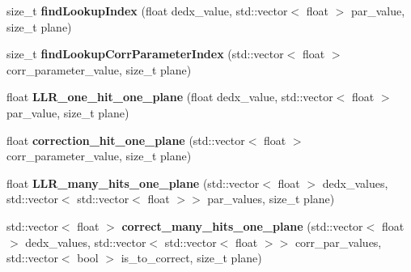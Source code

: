 \begin{DoxyCompactItemize}
\item 
size\+\_\+t {\bfseries find\+Lookup\+Index} (float dedx\+\_\+value, std\+::vector$<$ float $>$ par\+\_\+value, size\+\_\+t plane)\hypertarget{classsearchingfornues_1_1LLRPID_a891182e0af5e60e975e86ea5d2973e11}{}\label{classsearchingfornues_1_1LLRPID_a891182e0af5e60e975e86ea5d2973e11}

\item 
size\+\_\+t {\bfseries find\+Lookup\+Corr\+Parameter\+Index} (std\+::vector$<$ float $>$ corr\+\_\+parameter\+\_\+value, size\+\_\+t plane)\hypertarget{classsearchingfornues_1_1LLRPID_a855edcd3348bff52449abd4b90b42838}{}\label{classsearchingfornues_1_1LLRPID_a855edcd3348bff52449abd4b90b42838}

\item 
float {\bfseries L\+L\+R\+\_\+one\+\_\+hit\+\_\+one\+\_\+plane} (float dedx\+\_\+value, std\+::vector$<$ float $>$ par\+\_\+value, size\+\_\+t plane)\hypertarget{classsearchingfornues_1_1LLRPID_a615612fe3657b51e18bf1e514399363a}{}\label{classsearchingfornues_1_1LLRPID_a615612fe3657b51e18bf1e514399363a}

\item 
float {\bfseries correction\+\_\+hit\+\_\+one\+\_\+plane} (std\+::vector$<$ float $>$ corr\+\_\+parameter\+\_\+value, size\+\_\+t plane)\hypertarget{classsearchingfornues_1_1LLRPID_a06901bea0c1a2e5b9e3d4ce8b5a96e82}{}\label{classsearchingfornues_1_1LLRPID_a06901bea0c1a2e5b9e3d4ce8b5a96e82}

\item 
float {\bfseries L\+L\+R\+\_\+many\+\_\+hits\+\_\+one\+\_\+plane} (std\+::vector$<$ float $>$ dedx\+\_\+values, std\+::vector$<$ std\+::vector$<$ float $>$$>$ par\+\_\+values, size\+\_\+t plane)\hypertarget{classsearchingfornues_1_1LLRPID_ac8090da570daccff827fa96685b54f1e}{}\label{classsearchingfornues_1_1LLRPID_ac8090da570daccff827fa96685b54f1e}

\item 
std\+::vector$<$ float $>$ {\bfseries correct\+\_\+many\+\_\+hits\+\_\+one\+\_\+plane} (std\+::vector$<$ float $>$ dedx\+\_\+values, std\+::vector$<$ std\+::vector$<$ float $>$$>$ corr\+\_\+par\+\_\+values, std\+::vector$<$ bool $>$ is\+\_\+to\+\_\+correct, size\+\_\+t plane)\hypertarget{classsearchingfornues_1_1LLRPID_a2ac2b47463117811580f4e52f99bd1b2}{}\label{classsearchingfornues_1_1LLRPID_a2ac2b47463117811580f4e52f99bd1b2}

\end{DoxyCompactItemize}
